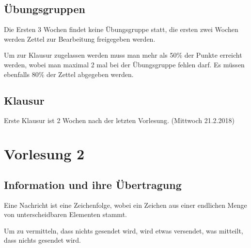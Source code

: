 \documentclass[12pt,a4paper]{article} %
\begin{document}
\subsection{Übungsgruppen}
Die Ersten 3 Wochen findet keine Übungsgruppe statt, die ersten zwei Wochen werden Zettel zur Bearbeitung freigegeben werden. 

Um zur Klausur zugelassen werden muss man mehr als 50\% der Punkte erreicht werden, wobei man maximal 2 mal bei der Übungsgruppe fehlen darf. Es müssen ebenfalls 80\% der Zettel abgegeben werden. 

\subsection{Klausur}
Erste Klausur ist 2 Wochen nach der letzten Vorlesung. (Mittwoch 21.2.2018)

\newpage
\section{Vorlesung 2}
\subsection{Information und ihre Übertragung}
Eine Nachricht ist eine Zeichenfolge, wobei ein Zeichen aus einer endlichen Menge von unterscheidbaren Elementen stammt. 

Um zu vermitteln, dass nichts gesendet wird, wird etwas versendet, was mitteilt, dass nichts gesendet wird.
\end{document}
